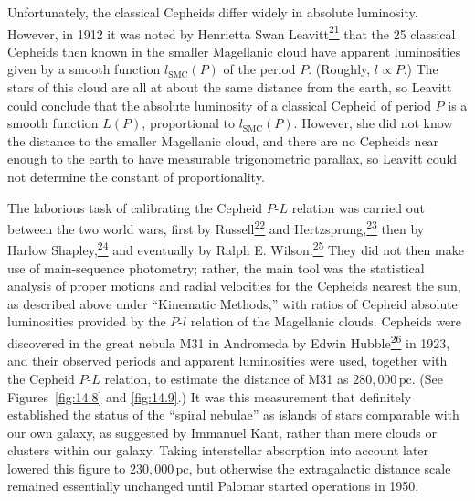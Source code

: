Unfortunately, the classical Cepheids differ widely in absolute luminosity.
However, in 1912 it was noted by Henrietta Swan
Leavitt\hyperref[ch14-ref-21]{\textsuperscript{21}} that the 25 classical
Cepheids then known in the smaller Magellanic cloud have apparent
luminosities given by a smooth function \(l_{\mathrm{SMC}}(P)\) of the
period \(P\). (Roughly, \(l\propto P\).) The stars of this cloud are all at
about the same distance from the earth, so Leavitt could conclude that the
absolute luminosity of a classical Cepheid of period \(P\) is a smooth
function \(L(P)\), proportional to \(l_{\mathrm{SMC}}(P)\). However, she did
not know the distance to the smaller Magellanic cloud, and there are no
Cepheids near enough to the earth to have measurable trigonometric parallax,
so Leavitt could not determine the constant of proportionality.



The laborious task of calibrating the Cepheid \(P\)-\(L\) relation was
carried out between the two world wars, first by
Russell\hyperref[ch14-ref-22]{\textsuperscript{22}} and
Hertzsprung,\hyperref[ch14-ref-23]{\textsuperscript{23}} then by Harlow
Shapley,\hyperref[ch14-ref-24]{\textsuperscript{24}} and eventually by
Ralph E. Wilson.\hyperref[ch14-ref-25]{\textsuperscript{25}} They did not
then make use of main-sequence photometry; rather, the main tool was the
statistical analysis of proper motions and radial velocities for the
Cepheids nearest the sun, as described above under ``Kinematic Methods,''
with ratios of Cepheid absolute luminosities provided by the \(P\)-\(l\)
relation of the Magellanic clouds. Cepheids were discovered in the great
nebula M31 in Andromeda by Edwin
Hubble\hyperref[ch14-ref-26]{\textsuperscript{26}} in 1923, and their
observed periods and apparent luminosities were used, together with the
Cepheid \(P\)-\(L\) relation, to estimate the distance of M31 as
\(280{,}000\,\mathrm{pc}\). (See Figures~\ref{fig:14.8} and
\ref{fig:14.9}.) It was this measurement that definitely established the
status of the ``spiral nebulae'' as islands of stars comparable with our own
galaxy, as suggested by Immanuel Kant, rather than mere clouds or clusters
within our galaxy. Taking interstellar absorption into account later lowered
this figure to \(230{,}000\,\mathrm{pc}\), but otherwise the extragalactic
distance scale remained essentially unchanged until Palomar started
operations in 1950.



